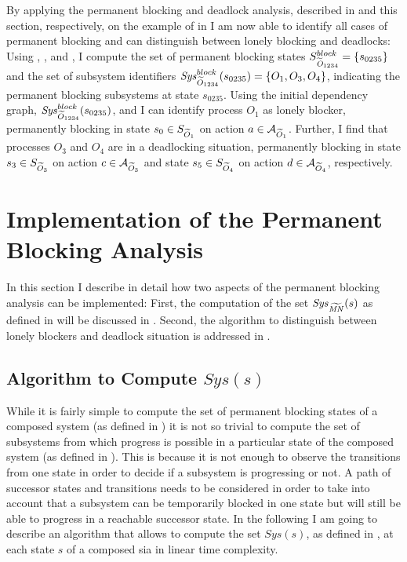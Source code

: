 By applying the permanent blocking and deadlock analysis, described in \Sect{\ref{sect_block_perm_assembly}} and this section, respectively, on the example of \Fig{\ref{fig_pnsc_cycles}} in \Sect{\ref{sect_block_perm}} I am now able to identify all cases of permanent blocking and can distinguish between lonely blocking and deadlocks:
Using \Equ{\ref{eq_sia_sys_aliven}}, \Equ{\ref{eq_sia_sysn}}, and \Equ{\ref{eq_sia_blockn}}, I compute the set of permanent blocking states $S_{\widetilde{\mathit{O}}_{1234}}^{block} = \{s_{0235}\}$ and the set of subsystem identifiers $\mathit{Sys}_{\widetilde{O}_{1234}}^{block}(s_{0235}) = \{O_1, O_3, O_4\}$, indicating the permanent blocking subsystems at state $s_{0235}$.
Using the initial dependency graph, $\mathit{Sys}_{\widetilde{O}_{1234}}^{block}(s_{0235})$, and \Equ{\ref{eq_circularn}} I can identify process $O_1$ as lonely blocker, permanently blocking in state $s_0 \in S_{\widetilde{O}_1}$ on action $a \in \mathcal{A}_{\widetilde{O}_1}$.
Further, I find that processes $O_3$ and $O_4$ are in a deadlocking situation, permanently blocking in state $s_3 \in S_{\widetilde{O}_3}$ on action $c \in \mathcal{A}_{\widetilde{O}_3}$ and state $s_5 \in S_{\widetilde{O}_4}$ on action $d \in \mathcal{A}_{\widetilde{O}_4}$, respectively.

\section{Implementation of the Permanent Blocking Analysis}
\label{sect_block_impl}
In this section I describe in detail how two aspects of the permanent blocking analysis can be implemented:
First, the computation of the set $\mathit{Sys}_{\widetilde{\mathit{MN}}}(s)$ as defined in \Equ{\ref{eq_sia_sys_aliven}} will be discussed in \Sect{\ref{sect_block_perm_alg}}.
Second, the algorithm to distinguish between lonely blockers and deadlock situation is addressed in \Sect{\ref{sect_block_dl_alg}}.

\subsection{Algorithm to Compute \texorpdfstring{$Sys(s)$}{the Set of Progressing Subsystems}}
\label{sect_block_perm_alg}
While it is fairly simple to compute the set of permanent blocking states of a composed system (as defined in \Equ{\ref{eq_sia_block}}) it is not so trivial to compute the set of subsystems from which progress is possible in a particular state of the composed system (as defined in \Equ{\ref{eq_sia_sys_alive}}).
This is because it is not enough to observe the transitions from one state in order to decide if a subsystem is progressing or not.
A path of successor states and transitions needs to be considered in order to take into account that a subsystem can be temporarily blocked in one state but will still be able to progress in a reachable successor state.
In the following I am going to describe an algorithm that allows to compute the set $\mathit{Sys}(s)$, as defined in \Equ{\ref{eq_sia_sys_alive}}, at each state $s$ of a composed \gls{sia} in linear time complexity.

